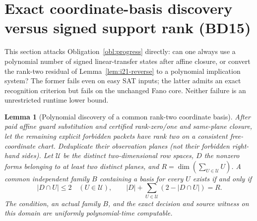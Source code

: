 \documentclass[11pt]{article}
\newtheorem{lemma}[theorem]{Lemma}
\begin{document}
\section{Exact coordinate-basis discovery versus signed support rank (BD15)}\label{sec:bd15}
This section attacks Obligation~\ref{obl:progress} directly: can one always use a polynomial number of signed linear-transfer states after affine closure, or convert the rank-two residual of Lemma~\ref{lem:i21-reverse} to a polynomial implication system? The former fails even on easy SAT inputs; the latter admits an exact recognition criterion but fails on the unchanged Fano core. Neither failure is an unrestricted runtime lower bound.

\begin{lemma}[Polynomial discovery of a common rank-two coordinate basis]\label{lem:bd15-basis}
After paid affine guard substitution and certified rank-zero/one and same-plane closure, let the remaining explicit forbidden packets have rank two on a consistent free-coordinate chart. Deduplicate their observation planes (not their forbidden right-hand sides). Let $\mathcal U$ be the distinct two-dimensional row spaces, $D$ the nonzero forms belonging to at least two distinct planes, and $R=\dim(\sum_{U\in\mathcal U}U)$. A common independent family $B$ containing a basis for every $U$ exists if and only if
\[
 |D\cap U|\le2\quad(U\in\mathcal U),\qquad
 |D|+\sum_{U\in\mathcal U}(2-|D\cap U|)=R.
\]
The condition, an actual family $B$, and the exact decision and source witness on this domain are uniformly polynomial-time computable.
\end{lemma}
\end{document}
